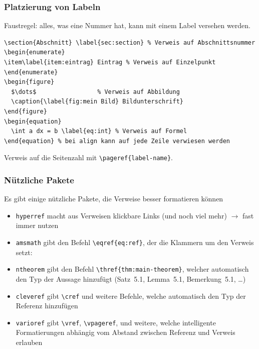 \begin{frame}[fragile]
  \frametitle{Platzierung von Labeln}

  \onslide<+->

  Faustregel: alles, was eine Nummer hat, kann mit einem Label versehen werden.

  \onslide<+->
\begin{lstlisting}
\section{Abschnitt} \label{sec:section} % Verweis auf Abschnittsnummer
\begin{enumerate}
\item\label{item:eintrag} Eintrag % Verweis auf Einzelpunkt
\end{enumerate}
\begin{figure}
  $\dots$                 % Verweis auf Abbildung
  \caption{\label{fig:mein Bild} Bildunterschrift}
\end{figure}
\begin{equation}
  \int a dx = b \label{eq:int} % Verweis auf Formel
\end{equation} % bei align kann auf jede Zeile verwiesen werden
\end{lstlisting}

  \onslide<+->

  Verweis auf die Seitenzahl mit \lstinline!\pageref{label-name}!.

\end{frame}

\begin{frame}[fragile]
  \frametitle{Nützliche Pakete}

  \onslide<+->

  Es gibt einige nützliche Pakete, die Verweise besser formatieren können

  \begin{itemize}
    \item<+-> \lstinline!hyperref! macht aus Verweisen klickbare Links (und noch viel mehr) $\to$ fast immer nutzen
    \item<+-> \lstinline!amsmath! gibt den Befehl \lstinline!\eqref{eq:ref}!, der die Klammern um den Verweis setzt: %
    \item<+-> \lstinline!ntheorem! gibt den Befehl \lstinline!\thref{thm:main-theorem}!,
      welcher automatisch den Typ der Aussage hinzufügt (Satz~5.1, Lemma~5.1, Bemerkung~5.1,
      \dots)
    \item<+-> \lstinline!cleveref! gibt \lstinline!\cref! und weitere Befehle, welche
      automatisch den Typ der Referenz hinzufügen
    \item<+-> \lstinline!varioref! gibt \lstinline!\vref!, \lstinline!\vpageref!, und
      weitere, welche intelligente Formatierungen abhängig vom Abstand zwischen Referenz und
      Verweis erlauben
  \end{itemize}

\end{frame}

